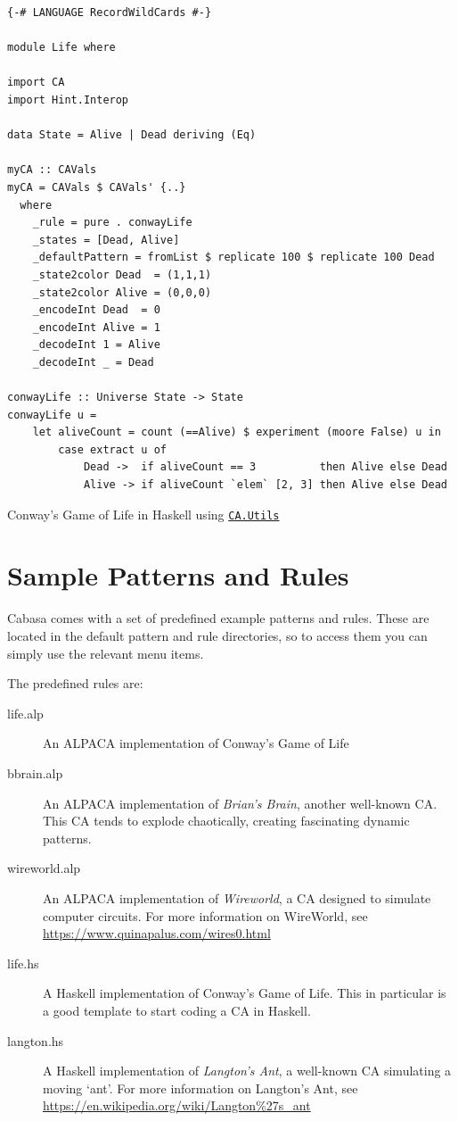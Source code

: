 \documentclass[oneside,a4paper]{memoir}
\newcommand\hreftt[2]{\href{#1}{\texttt{#2}}}
\begin{document}
\begin{listing}[!b]
\begin{verbatim}
{-# LANGUAGE RecordWildCards #-}

module Life where

import CA
import Hint.Interop

data State = Alive | Dead deriving (Eq)

myCA :: CAVals
myCA = CAVals $ CAVals' {..}
  where
    _rule = pure . conwayLife
    _states = [Dead, Alive]
    _defaultPattern = fromList $ replicate 100 $ replicate 100 Dead
    _state2color Dead  = (1,1,1)
    _state2color Alive = (0,0,0)
    _encodeInt Dead  = 0
    _encodeInt Alive = 1
    _decodeInt 1 = Alive
    _decodeInt _ = Dead

conwayLife :: Universe State -> State
conwayLife u =
    let aliveCount = count (==Alive) $ experiment (moore False) u in
        case extract u of
            Dead ->  if aliveCount == 3          then Alive else Dead
            Alive -> if aliveCount `elem` [2, 3] then Alive else Dead
\end{verbatim}
\caption{Conway's Game of Life in Haskell using \hreftt{haskell/CA-Utils.html}{CA.Utils}}
\label{lst:ugol}
\end{listing}

\appendix

\chapter{Sample Patterns and Rules}
\label{chap:samps}

Cabasa comes with a set of predefined example patterns and rules.
These are located in the default pattern and rule directories,
  so to access them you can simply use the relevant  menu items.

The predefined rules are:

\begin{description}
\item[life.alp] An ALPACA implementation of Conway's Game of Life
\item[bbrain.alp] An ALPACA implementation of \emph{Brian's Brain}, another well-known CA.
  This CA tends to explode chaotically, creating fascinating dynamic patterns.
\item[wireworld.alp] An ALPACA implementation of \emph{Wireworld}, a CA designed to simulate computer circuits.
  For more information on WireWorld, see \url{https://www.quinapalus.com/wires0.html}
\item[life.hs] A Haskell implementation of Conway's Game of Life.
  This in particular is a good template to start coding a CA in Haskell.
\item[langton.hs] A Haskell implementation of \textit{Langton's Ant}, a well-known CA simulating a moving `ant'.
  For more information on Langton's Ant, see \url{https://en.wikipedia.org/wiki/Langton%27s_ant}
\end{description}
\end{document}
